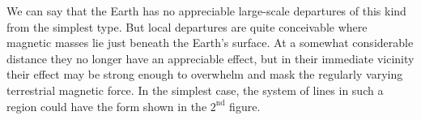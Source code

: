 We can say that the Earth has no appreciable large-scale departures of this kind from the simplest type. But local departures are quite conceivable where magnetic masses lie just beneath the Earth's surface. At a somewhat considerable distance they no longer have an appreciable effect, but in their immediate vicinity their effect may be strong enough to overwhelm and mask the regularly varying terrestrial magnetic force. In the simplest case, the system of lines in such a region could have the form shown in the $2^{\mathrm{nd}}$ figure.

